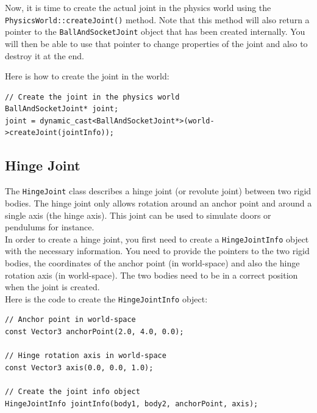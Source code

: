 \documentclass[a4paper,12pt]{article}
\begin{document}
    \vspace{0.6cm}

    \begin{sloppypar}
    Now, it is time to create the actual joint in the physics world using the \texttt{PhysicsWorld::createJoint()} method.
    Note that this method will also return a pointer to the \texttt{BallAndSocketJoint} object that has been created internally. You will then
    be able to use that pointer to change properties of the joint and also to destroy it at the end. \\
    \end{sloppypar}

    Here is how to create the joint in the world: \\

    \begin{lstlisting}
// Create the joint in the physics world
BallAndSocketJoint* joint;
joint = dynamic_cast<BallAndSocketJoint*>(world->createJoint(jointInfo));
  \end{lstlisting}

    \vspace{0.6cm}

    \subsection{Hinge Joint}

    The \texttt{HingeJoint} class describes a hinge joint (or revolute joint) between two rigid bodies. The hinge joint only allows rotation around an
    anchor point and around a single axis (the hinge axis). This joint can be used to simulate doors or pendulums for instance. \\

    In order to create a hinge joint, you first need to create a \texttt{HingeJointInfo} object with the necessary information. You need to provide
    the pointers to the two rigid bodies, the coordinates of the anchor point (in world-space) and also the hinge rotation axis (in world-space). The
    two bodies need to be in a correct position when the joint is created. \\

    Here is the code to create the \texttt{HingeJointInfo} object: \\

    \begin{lstlisting}
// Anchor point in world-space
const Vector3 anchorPoint(2.0, 4.0, 0.0);

// Hinge rotation axis in world-space
const Vector3 axis(0.0, 0.0, 1.0);

// Create the joint info object
HingeJointInfo jointInfo(body1, body2, anchorPoint, axis);
  \end{lstlisting}
\end{document}
